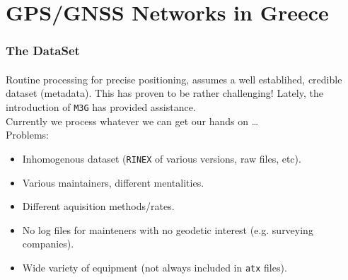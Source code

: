 \section{GPS/GNSS Networks in Greece}

\begin{frame}\frametitle{The DataSet}\framesubtitle{}
\vskip-1.5cm
  Routine processing for precise positioning, assumes a well establihed, 
  credible dataset (metadata). This has proven to be rather challenging! Lately, 
  the introduction of \texttt{M3G} has provided assistance.\\
  \bigskip
  Currently we process whatever we can get our hands on \ldots\\
  Problems:
  \begin{itemize}
    \item Inhomogenous dataset (\texttt{RINEX} of various versions, raw files, etc).
    \item Various maintainers, different mentalities.
    \item Different aquisition methods/rates.
    \item No log files for mainteners with no geodetic interest (e.g. surveying companies).
    \item Wide variety of equipment (not always included in \texttt{atx} files).
  \end{itemize}
\end{frame}
\note


